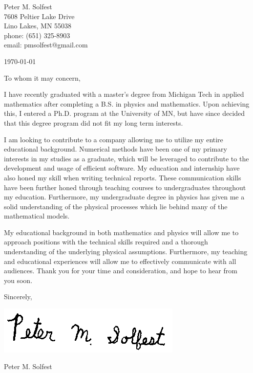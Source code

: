 \documentclass[letterpaper,12pt]{article}
\begin{document}
Peter M. Solfest\\
7608 Peltier Lake Drive\\
Lino Lakes, MN 55038\\
phone: (651) 325-8903\\
email: pmsolfest@gmail.com

\today


To whom it may concern, %

I have recently graduated with a master's degree from Michigan Tech in applied mathematics after
completing a B.S. in physics and mathematics.
Upon achieving this, I entered a Ph.D. program at the University of MN, but have since
decided that this degree program did not fit my long term interests.

I am looking to contribute to a company allowing me to utilize my entire educational background.
Numerical methods have been one of my primary interests in my studies as a graduate,
which will be leveraged to contribute to the development and usage of efficient software.
My education and internship have also honed my skill when writing technical reports.
These communication skills have been further honed through teaching courses to undergraduates
throughout my education.
Furthermore, my undergraduate degree in physics has given me a solid understanding of the
physical processes which lie behind many of the mathematical models.

My educational background in both mathematics and physics will allow 
me to approach positions with the technical skills required and a thorough understanding
of the underlying physical assumptions.
Furthermore, my teaching and educational experiences will allow me to 
effectively communicate with all audiences.
Thank you for your time and consideration, and hope to hear from you soon.

Sincerely,

\includegraphics[height=.5in]{signature.png}

Peter M. Solfest
\end{document}
